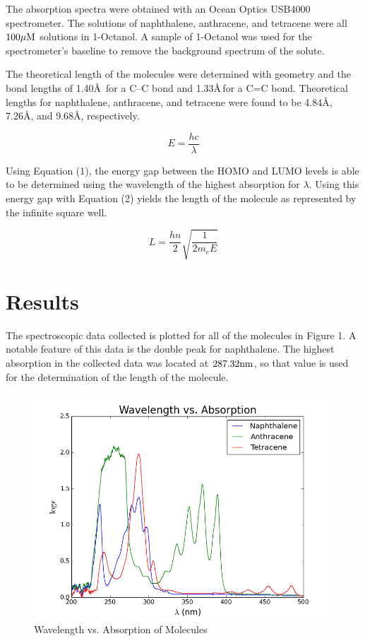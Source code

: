 \documentclass[10pt,a4paper]{article}
\begin{document}
The absorption spectra were obtained with an Ocean Optics USB4000 spectrometer. The solutions of naphthalene, anthracene, and tetracene were all $100 \mu \rm{M}$ solutions in 1-Octanol. A sample of 1-Octanol was used for the spectrometer's baseline to remove the background spectrum of the solute.

The theoretical length of the molecules were determined with geometry and the bond lengths of 1.40\AA\, for a C--C bond and 1.33\AA \,for a C=C bond. Theoretical lengths for naphthalene, anthracene, and tetracene were found to be 4.84\AA, 7.26\AA, and 9.68\AA, respectively.

\begin{equation}
E = \frac{hc}{\lambda}
\end{equation}

Using Equation (1), the energy gap between the HOMO and LUMO levels is able to be determined using the wavelength of the highest absorption for $\lambda$. Using this energy gap with Equation (2) yields the length of the molecule as represented by the infinite square well.

\begin{equation}
L = \frac{hn}{2} \sqrt{\frac{1}{2 m_e E}}
\end{equation}

\section*{Results}

The spectroscopic data collected is plotted for all of the molecules in Figure 1. A notable feature of this data is the double peak for naphthalene. The highest absorption in the collected data was located at $287.32\rm{nm}$, so that value is used for the determination of the length of the molecule.

\begin{figure}[h]
\includegraphics[width=\linewidth]{plot.png}
\caption{Wavelength vs. Absorption of Molecules}
\end{figure}
\end{document}
